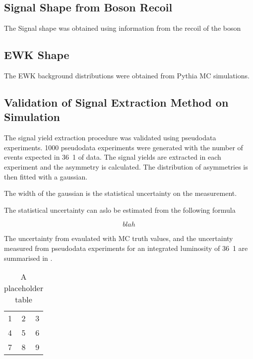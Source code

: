 \subsection{Signal \ETm Shape from Boson Recoil}

The Signal \ETm shape was obtained using information from the recoil of the
boson

\subsection{\ac{EWK} \ETm Shape}

The \ac{EWK} background \ETm distributions were obtained from Pythia \ac{MC}
simulations.


\subsection{Validation of Signal Extraction Method on Simulation}

The signal yield extraction procedure was validated using pseudodata
experiments. 1000 pseudodata experiments were generated with the number of
events expected in \unit{36.1}{\invpb} of data. The signal yields are extracted
in each experiment and the asymmetry is calculated. The distribution of
asymmetries is then fitted with a gaussian.

The width of the gaussian is the statistical uncertainty on the measurement.

The statistical uncertainty can aslo be estimated from the following formula

\begin{equation}
  blah
  \label{asym36:statuncert}
\end{equation}

The uncertainty from  evaulated with \ac{MC} truth
values, and the uncertainty measured from pseudodata experiments for an
integrated luminosity of \unit{36.1}{\invpb} are summarised in
.

\begin{table}[htb]
  \centering
  \begin{tabular}{| l c r |}
    \hline
    1 & 2 & 3 \\
    4 & 5 & 6 \\
    7 & 8 & 9 \\
  \hline
  \end{tabular}
  \caption{A placeholder table}
  \label{asym36:statuncertsum}
\end{table}

